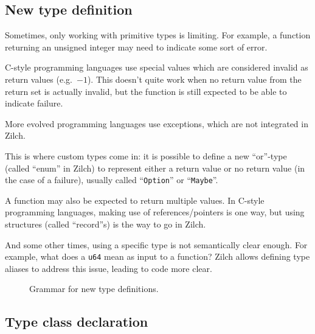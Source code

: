 \subsection{New type definition}\label{subsec:zilch-grammar-declarations-type}

Sometimes, only working with primitive types is limiting.
For example, a function returning an unsigned integer may need to indicate some sort of error.

\noindent C-style programming languages use special values which are considered invalid as return values (e.g.\ $-1$).
This doesn't quite work when no return value from the return set is actually invalid, but the function is still expected to be able to indicate failure.

\noindent More evolved programming languages use exceptions, which are not integrated in Zilch.

\noindent This is where custom types come in: it is possible to define a new ``or''-type (called ``enum'' in Zilch) to represent either a return value or no return value (in the case of a failure), usually called ``\texttt{Option}'' or ``\texttt{Maybe}''.

A function may also be expected to return multiple values.
In C-style programming languages, making use of references/pointers is one way, but using structures (called ``record''s) is the way to go in Zilch.

And some other times, using a specific type is not semantically clear enough.
For example, what does a \texttt{u64} mean as input to a function?
Zilch allows defining type aliases to address this issue, leading to code more clear.

\begin{figure}[H]
	\centering


	\caption{Grammar for new type definitions.}
	\label{fig:zilch-grammar-declarations-type-grammar}
\end{figure}

\subsection{Type class declaration}\label{subsec:zilch-grammar-declarations-typeclass}

